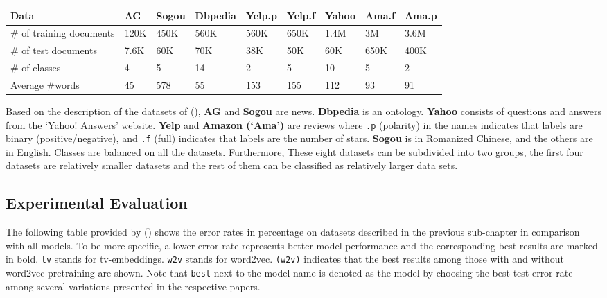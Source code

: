 \documentclass[]{krantz}
\begin{document}
\begin{longtable}[]{@{}lllllllll@{}}
\toprule
Data & AG & Sogou & Dbpedia & Yelp.p & Yelp.f & Yahoo & Ama.f & Ama.p\tabularnewline
\midrule
\endhead
\# of training documents & 120K & 450K & 560K & 560K & 650K & 1.4M & 3M & 3.6M\tabularnewline
\# of test documents & 7.6K & 60K & 70K & 38K & 50K & 60K & 650K & 400K\tabularnewline
\# of classes & 4 & 5 & 14 & 2 & 5 & 10 & 5 & 2\tabularnewline
Average \#words & 45 & 578 & 55 & 153 & 155 & 112 & 93 & 91\tabularnewline
\bottomrule
\end{longtable}

Based on the description of the datasets of (\citet{Johnson2017DeepPC}), \textbf{AG} and \textbf{Sogou} are news. \textbf{Dbpedia} is an ontology. \textbf{Yahoo} consists of questions and answers from the `Yahoo! Answers' website. \textbf{Yelp} and \textbf{Amazon (`Ama')} are reviews where \texttt{.p} (polarity) in the names indicates that labels are binary (positive/negative), and \texttt{.f} (full) indicates that labels are the number of stars. \textbf{Sogou} is in Romanized Chinese, and the others are in English. Classes are balanced on all the datasets. Furthermore, These eight datasets can be subdivided into two groups, the first four datasets are relatively smaller datasets and the rest of them can be classified as relatively larger data sets.

\hypertarget{experimental-evaluation}{%
\subsection{Experimental Evaluation}\label{experimental-evaluation}}

The following table provided by (\citet{Johnson2017DeepPC}) shows the error rates in percentage on datasets described in the previous sub-chapter in comparison with all models. To be more specific, a lower error rate represents better model performance and the corresponding best results are marked in bold. \texttt{tv} stands for tv-embeddings. \texttt{w2v} stands for word2vec. \texttt{(w2v)} indicates that the best results among those with and without word2vec pretraining are shown. Note that \texttt{best} next to the model name is denoted as the model by choosing the best test error rate among several variations presented in the respective papers.
\end{document}
